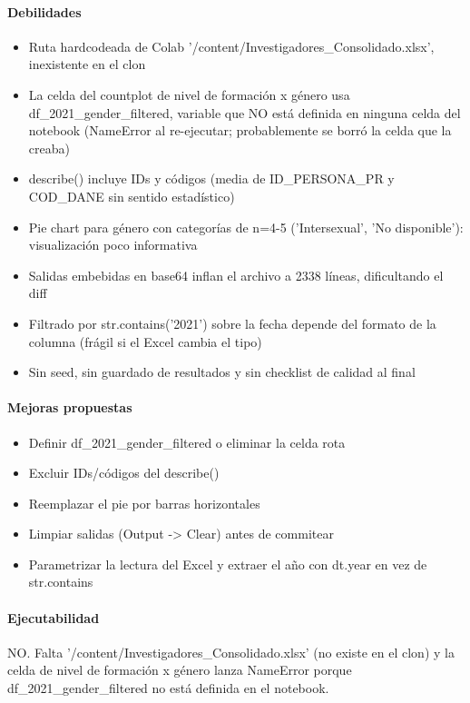\paragraph{Debilidades}
\begin{itemize}
  \item Ruta hardcodeada de Colab '/content/Investigadores\_Consolidado.xlsx', inexistente en el clon
  \item La celda del countplot de nivel de formación x género usa df\_2021\_gender\_filtered, variable que NO está definida en ninguna celda del notebook (NameError al re-ejecutar; probablemente se borró la celda que la creaba)
  \item describe() incluye IDs y códigos (media de ID\_PERSONA\_PR y COD\_DANE sin sentido estadístico)
  \item Pie chart para género con categorías de n=4-5 ('Intersexual', 'No disponible'): visualización poco informativa
  \item Salidas embebidas en base64 inflan el archivo a 2338 líneas, dificultando el diff
  \item Filtrado por str.contains('2021') sobre la fecha depende del formato de la columna (frágil si el Excel cambia el tipo)
  \item Sin seed, sin guardado de resultados y sin checklist de calidad al final
\end{itemize}

\paragraph{Mejoras propuestas}
\begin{itemize}
  \item Definir df\_2021\_gender\_filtered o eliminar la celda rota
  \item Excluir IDs/códigos del describe()
  \item Reemplazar el pie por barras horizontales
  \item Limpiar salidas (Output -> Clear) antes de commitear
  \item Parametrizar la lectura del Excel y extraer el año con dt.year en vez de str.contains
\end{itemize}

\paragraph{Ejecutabilidad}
NO. Falta '/content/Investigadores\_Consolidado.xlsx' (no existe en el clon) y la celda de nivel de formación x género lanza NameError porque df\_2021\_gender\_filtered no está definida en el notebook.


